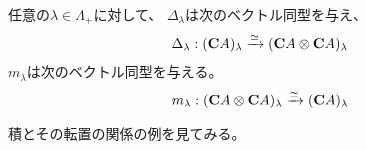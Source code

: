 	\begin{proposition}[非ゼロ固有空間の同型射]\label{prop:非ゼロ固有空間の同型射} %
		任意の$\lambda\in\Lambda_+$に対して、
		$\Delta_\lambda$は次のベクトル同型を与え、
		\begin{equation*}\begin{split} %
			\Delta_\lambda: (\mybf{C}A)_\lambda
			\xrightarrow{\simeq} (\mybf{C}A\otimes\mybf{C}A)_\lambda
		\end{split}\end{equation*} %
		$m_\lambda$は次のベクトル同型を与える。
		\begin{equation*}\begin{split} %
			m_\lambda: (\mybf{C}A\otimes\mybf{C}A)_\lambda
			\xrightarrow{\simeq} (\mybf{C}A)_\lambda
		\end{split}\end{equation*} %
	\end{proposition} %

	積とその転置の関係の例を見てみる。

